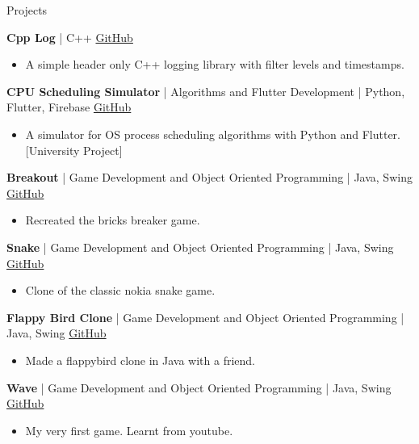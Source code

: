 \documentclass{resume}
\begin{document}
\begin{rSection}{Projects}
\item \textbf{Cpp Log} | {C++} \hfill \href{https://github.com/JayNakum/CppLog}{GitHub}
\begin{itemize}
    \item A simple header only C++ logging library with filter levels and timestamps.
 \end{itemize}

\item \textbf{CPU Scheduling Simulator} | {Algorithms and Flutter Development} | {Python, Flutter, Firebase} \hfill \href{https://github.com/JayNakum/OperatingSystemsProject}{GitHub}
\begin{itemize}
    \item A simulator for OS process scheduling algorithms with Python and Flutter. [University Project]
 \end{itemize}

 \item \textbf{Breakout} | {Game Development and Object Oriented Programming} | {Java, Swing} \hfill \href{https://github.com/JayNakum/Breakout}{GitHub}
\begin{itemize}
     \item Recreated the bricks breaker game.
 \end{itemize}

 \item \textbf{Snake} | {Game Development and Object Oriented Programming} | {Java, Swing} \hfill \href{https://github.com/JayNakum/Snake}{GitHub}
\begin{itemize}
     \item Clone of the classic nokia snake game.
 \end{itemize}

\item \textbf{Flappy Bird Clone} | {Game Development and Object Oriented Programming} | {Java, Swing} \hfill \href{https://github.com/Madhav-Parikh/FlappyBird}{GitHub}
\begin{itemize}
     \item Made a flappybird clone in Java with a friend.
 \end{itemize}

 \item \textbf{Wave} | {Game Development and Object Oriented Programming} | {Java, Swing} \hfill \href{https://github.com/JayNakum/Wave}{GitHub}
\begin{itemize}
     \item My very first game. Learnt from youtube.
 \end{itemize}


\end{rSection}
\end{document}
